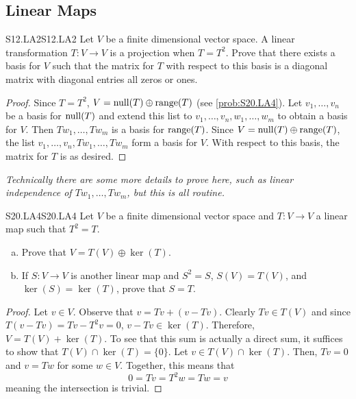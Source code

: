 \documentclass[../AlgebraQualSolutions.tex]{subfiles}
\begin{document}
\subsection{Linear Maps}

	\begin{prob}{S12.LA2}{S12.LA2}
		Let $V$ be a finite dimensional vector space. A linear transformation $T: V \to V$ is a projection when $T = T^2$. Prove that there exists a basis for $V$ such that the matrix for $T$ with respect to this basis is a diagonal matrix with diagonal entries all zeros or ones.
	\end{prob}

	\begin{proof}
		Since $T = T^2$, $V = \mathrm{null}(T) \oplus \mathrm{range}(T)$ (see \ref{prob:S20.LA4}). Let $v_1,\ldots, v_n$ be a basis for $\mathrm{null}(T)$ and extend this list to $v_1,\ldots, v_n, w_1,\ldots,w_m$ to obtain a basis for $V$. Then $Tw_1,\ldots, Tw_m$ is a basis for $\mathrm{range}(T)$. Since $V = \mathrm{null}(T) \oplus \mathrm{range}(T)$, the list $v_1,\ldots, v_n, Tw_1,\ldots, Tw_m$ form a basis for $V$. With respect to this basis, the matrix for $T$ is as desired.
	\end{proof}

	\emph{Technically there are some more details to prove here, such as linear independence of $Tw_1,\ldots, Tw_m$, but this is all routine.}

	\begin{prob}{S20.LA4}{S20.LA4}
		Let $V$ be a finite dimensional vector space and $T: V \to V$ a linear map such that $T^2 = T$.
		\begin{enumerate}[(a)]
			\item Prove that $V = T(V) \oplus \ker(T)$.
			\item If $S: V \to V$ is another linear map and $S^2 = S$, $S(V) = T(V)$, and $\ker(S) = \ker(T)$, prove that $S = T$.
		\end{enumerate}
	\end{prob}

	\begin{proof}
		Let $v \in V$. Observe that $v = Tv + (v - Tv)$. Clearly $Tv \in T(V)$ and since $T(v - Tv) = Tv - T^2v = 0$, $v - Tv \in \ker(T)$. Therefore, $V = T(V) + \ker(T)$. To see that this sum is actually a direct sum, it suffices to show that $T(V) \cap \ker(T) = \{0\}$. Let $v \in T(V) \cap \ker(T)$. Then, $Tv = 0$ and $v = Tw$ for some $w \in V$. Together, this means that
			\[0 = Tv = T^2w = Tw = v\]
		meaning the intersection is trivial.
	\end{proof}
\end{document}
